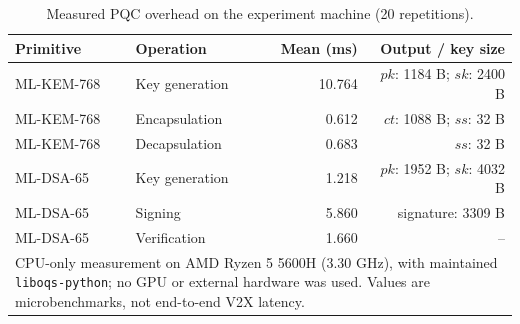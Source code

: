 \begin{table}[t]
\caption{Measured PQC overhead on the experiment machine (20 repetitions).}
\label{tab:pqc-overhead}
\centering
\footnotesize
\setlength{\tabcolsep}{4.8pt}
\begin{tabular}{llrr}
\toprule
\textbf{Primitive} & \textbf{Operation} & \textbf{Mean (ms)} & \textbf{Output / key size} \\
\midrule
ML-KEM-768 & Key generation & 10.764 & $pk$: 1184 B; $sk$: 2400 B \\
ML-KEM-768 & Encapsulation & 0.612 & $ct$: 1088 B; $ss$: 32 B \\
ML-KEM-768 & Decapsulation & 0.683 & $ss$: 32 B \\
ML-DSA-65 & Key generation & 1.218 & $pk$: 1952 B; $sk$: 4032 B \\
ML-DSA-65 & Signing & 5.860 & signature: 3309 B \\
ML-DSA-65 & Verification & 1.660 & -- \\
\bottomrule
\multicolumn{4}{p{7.35cm}}{\scriptsize CPU-only measurement on AMD Ryzen 5 5600H (3.30 GHz), with maintained \texttt{liboqs-python}; no GPU or external hardware was used. Values are microbenchmarks, not end-to-end V2X latency.} \\
\end{tabular}
\end{table}
